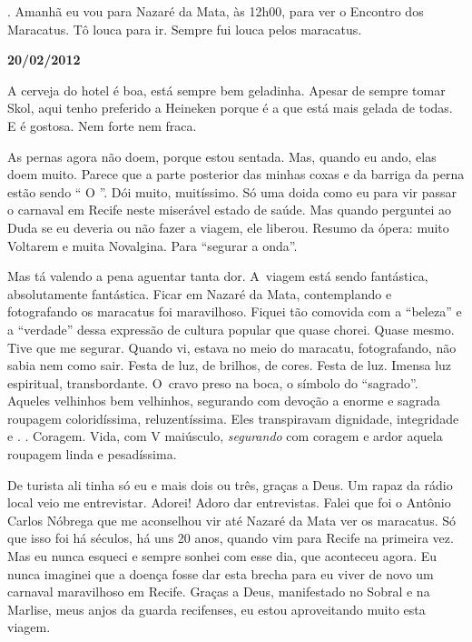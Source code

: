  . Amanhã eu vou para Nazaré da Mata, às 12h00, para ver o
Encontro dos Maracatus. Tô louca para ir. Sempre fui louca pelos
maracatus.

\begin{center}\asterisc{}\end{center}


\begin{flushright}\textbf{20/02/2012}\end{flushright}


A cerveja do hotel é boa, está sempre bem geladinha. Apesar de sempre
tomar Skol, aqui tenho preferido a Heineken porque é a que está mais
gelada de todas. E é gostosa. Nem forte nem fraca.

As pernas agora não doem, porque estou sentada. Mas, quando eu ando,
elas doem muito. Parece que a parte posterior das minhas coxas e da
barriga da perna estão sendo `` O  ''. Dói muito,
muitíssimo. Só uma doida como eu para vir passar o carnaval em Recife
neste miserável estado de saúde. Mas quando perguntei ao Duda se eu
deveria ou não fazer a viagem, ele liberou. Resumo da ópera: muito
Voltarem e muita Novalgina. Para ``segurar a onda''.

Mas tá valendo a pena aguentar tanta dor. A~viagem está sendo
fantástica, absolutamente fantástica. Ficar em Nazaré da Mata,
contemplando e fotografando os maracatus foi maravilhoso. Fiquei tão
comovida com a ``beleza'' e a ``verdade'' dessa expressão de cultura
popular que quase chorei. Quase mesmo. Tive que me segurar. Quando vi,
estava no meio do maracatu, fotografando, não sabia nem como sair. Festa
de luz, de brilhos, de cores. Festa de luz. Imensa luz espiritual,
transbordante. O~cravo preso na boca, o símbolo do ``sagrado''. Aqueles
velhinhos bem velhinhos, segurando com devoção a enorme e sagrada
roupagem coloridíssima, reluzentíssima. Eles transpiravam dignidade,
integridade e .  . Coragem. Vida, com V maiúsculo,
\emph{segurando} com coragem e ardor aquela roupagem linda e
pesadíssima.

De turista ali tinha só eu e mais dois ou três, graças a Deus. Um rapaz
da rádio local veio me entrevistar. Adorei! Adoro dar entrevistas. Falei
que foi o Antônio Carlos Nóbrega que me aconselhou vir até Nazaré da
Mata ver os maracatus. Só que isso foi há séculos, há uns 20 anos,
quando vim para Recife na primeira vez. Mas eu nunca esqueci e sempre
sonhei com esse dia, que aconteceu agora. Eu nunca imaginei que a doença
fosse dar esta brecha para eu viver de novo um carnaval maravilhoso em
Recife. Graças a Deus, manifestado no Sobral e na Marlise, meus anjos da
guarda recifenses, eu estou aproveitando muito esta viagem.

